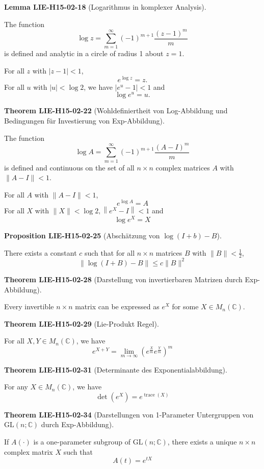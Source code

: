 \documentclass[10pt, letterpaper]{article}
\newcommand{\C}{\mathbb{C}}
\newcommand{\GL}{\mathrm{GL}}
\newcommand{\CustomHeading}[3]{%
  \par\medskip\noindent%
  \textbf{#1 #2} \textnormal{(#3)}.\enskip%
}
\newenvironment{PROP}[2]{\CustomHeading{Proposition}{#1}{#2}}{}
\newenvironment{THEO}[2]{\CustomHeading{Theorem}{#1}{#2}}{}
\newenvironment{LEM}[2]{\CustomHeading{Lemma}{#1}{#2}}{}
\begin{document}
\begin{LEM}{LIE-H15-02-18}{Logarithmus in komplexer Analysis}
The function
$$
\log z=\sum_{m=1}^{\infty}(-1)^{m+1} \frac{(z-1)^{m}}{m}
$$
is defined and analytic in a circle of radius 1 about $z=1$.

For all $z$ with $|z-1|<1$,
$$
e^{\log z}=z .
$$
For all $u$ with $|u|<\log 2$, we have $\left|e^{u}-1\right|<1$ and
$$
\log e^{u}=u .
$$
\end{LEM}

\begin{THEO}{LIE-H15-02-22}{Wohldefiniertheit von Log-Abbildung und Bedingungen für Investierung von Exp-Abbildung}
The function
$$
\log A=\sum_{m=1}^{\infty}(-1)^{m+1} \frac{(A-I)^{m}}{m}
$$
is defined and continuous on the set of all $n \times n$ complex matrices $A$ with $\|A-I\|<1$.

For all $A$ with $\|A-I\|<1$,
$$
e^{\log A}=A
$$
For all $X$ with $\|X\|<\log 2,\left\|e^{X}-I\right\|<1$ and
$$
\log e^{X}=X
$$
\end{THEO}

\begin{PROP}{LIE-H15-02-25}{Abschätzung von $\log (I+b)-B$}
There exists a constant $c$ such that for all $n \times n$ matrices $B$ with $\|B\|<\frac{1}{2}$,
$$
\|\log (I+B)-B\| \leq c\|B\|^{2}
$$
\end{PROP}

\begin{THEO}{LIE-H15-02-28}{Darstellung von invertierbaren Matrizen durch Exp-Abbildung}
Every invertible $n \times n$ matrix can be expressed as $e^{X}$ for some $X \in M_{n}(\mathbb{C})$.
\end{THEO}

\begin{THEO}{LIE-H15-02-29}{Lie-Produkt Regel}
For all $X, Y \in M_{n}(\mathbb{C})$, we have
$$
e^{X+Y}=\lim _{m \rightarrow \infty}\left(e^{\frac{X}{m}} e^{\frac{Y}{m}}\right)^{m}
$$
\end{THEO}

\begin{THEO}{LIE-H15-02-31}{Determinante des Exponentialabbildung}
For any $X \in M_{n}(\mathbb{C})$, we have
$$
\operatorname{det}\left(e^{X}\right)=e^{\operatorname{trace}(X)}
$$
\end{THEO}

\begin{THEO}{LIE-H15-02-34}{Darstellungen von 1-Parameter Untergruppen von $\GL(n;\C)$ durch Exp-Abbildung}
If $A(\cdot)$ is a one-parameter subgroup of $\mathrm{GL}(n ; \mathbb{C})$, there exists a unique $n \times n$ complex matrix $X$ such that
$$
A(t)=e^{t X}
$$
\end{THEO}
\end{document}

